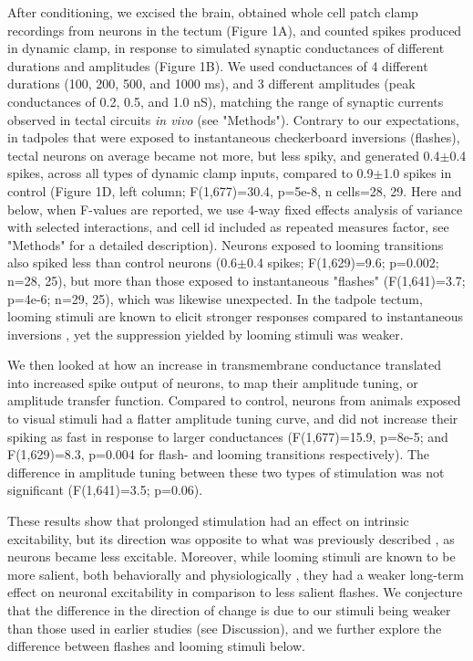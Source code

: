 \documentclass{article}
\begin{document}
After conditioning, we excised the brain, obtained whole cell patch clamp recordings from neurons in the tectum (Figure 1A), and counted spikes produced in dynamic clamp, in response to simulated synaptic conductances of different durations and amplitudes (Figure 1B). We used conductances of 4 different durations (100, 200, 500, and 1000 ms), and 3 different amplitudes (peak conductances of 0.2, 0.5, and 1.0 nS), matching the range of synaptic currents observed in tectal circuits \textit{in vivo} (see "Methods"). Contrary to our expectations, in tadpoles that were exposed to instantaneous checkerboard inversions (flashes), tectal neurons on average became not more, but less spiky, and generated 0.4$\pm$0.4 spikes, across all types of dynamic clamp inputs, compared to 0.9$\pm$1.0 spikes in control (Figure 1D, left column; F(1,677)=30.4, p=5e-8, n cells=28, 29. Here and below, when F-values are reported, we use 4-way fixed effects analysis of variance with selected interactions, and cell id included as repeated measures factor, see "Methods" for a detailed description). Neurons exposed to looming transitions also spiked less than control neurons (0.6$\pm$0.4 spikes; F(1,629)=9.6; p=0.002; n=28, 25), but more than those exposed to instantaneous "flashes" (F(1,641)=3.7; p=4e-6; n=29, 25), which was likewise unexpected. In the tadpole tectum, looming stimuli are known to elicit stronger responses compared to instantaneous inversions \citep{khakhalin2014}, yet the suppression yielded by looming stimuli was weaker.

We then looked at how an increase in transmembrane conductance translated into increased spike output of neurons, to map their amplitude tuning, or amplitude transfer function. Compared to control, neurons from animals exposed to visual stimuli had a flatter amplitude tuning curve, and did not increase their spiking as fast in response to larger conductances (F(1,677)=15.9, p=8e-5; and F(1,629)=8.3, p=0.004 for flash- and looming transitions respectively). The difference in amplitude tuning between these two types of stimulation was not significant (F(1,641)=3.5; p=0.06).

These results show that prolonged stimulation had an effect on intrinsic excitability, but its direction was opposite to what was previously described \citep{aizenman2003,ciarleglio2015}, as neurons became less excitable. Moreover, while looming stimuli are known to be more salient, both behaviorally and physiologically \citep{khakhalin2014}, they had a weaker long-term effect on neuronal excitability in comparison to less salient flashes. We conjecture that the difference in the direction of change is due to our stimuli being weaker than those used in earlier studies (see Discussion), and we further explore the difference between flashes and looming stimuli below.
\end{document}
